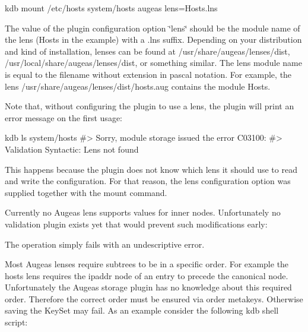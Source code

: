 \begin{DoxyCode}
kdb mount /etc/hosts system/hosts augeas lens=Hosts.lns
\end{DoxyCode}


The value of the plugin configuration option \char`\"{}lens\char`\"{} should be the module name of the lens (Hosts in the example) with a \textquotesingle{}.lns\textquotesingle{} suffix. Depending on your distribution and kind of installation, lenses can be found at {\ttfamily /usr/share/augeas/lenses/dist}, {\ttfamily /usr/local/share/augeas/lenses/dist}, or something similar. The lens module name is equal to the filename without extension in pascal notation. For example, the lens {\ttfamily /usr/share/augeas/lenses/dist/hosts.aug} contains the module Hosts.

Note that, without configuring the plugin to use a lens, the plugin will print an error message on the first usage\+:


\begin{DoxyCode}
kdb ls system/hosts
#> Sorry, module storage issued the error C03100:
#> Validation Syntactic: Lens not found
\end{DoxyCode}


This happens because the plugin does not know which lens it should use to read and write the configuration. For that reason, the lens configuration option was supplied together with the mount command.

Currently no Augeas lens supports values for inner nodes. Unfortunately no validation plugin exists yet that would prevent such modifications early\+:




The operation simply fails with an undescriptive error.

Most Augeas lenses require subtrees to be in a specific order. For example the hosts lens requires the ipaddr node of an entry to precede the canonical node. Unfortunately the Augeas storage plugin has no knowledge about this required order. Therefore the correct order must be ensured via order metakeys. Otherwise saving the Key\+Set may fail. As an example consider the following kdb shell script\+:


